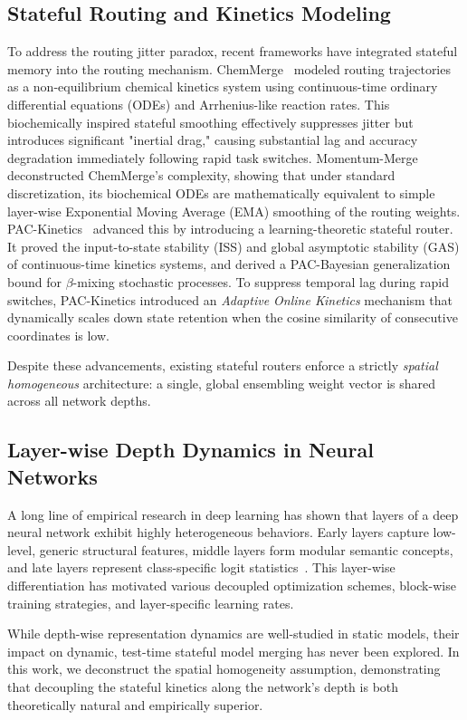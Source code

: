 \subsection{Stateful Routing and Kinetics Modeling}
To address the routing jitter paradox, recent frameworks have integrated stateful memory into the routing mechanism. ChemMerge~\cite{chemmerge_2026} modeled routing trajectories as a non-equilibrium chemical kinetics system using continuous-time ordinary differential equations (ODEs) and Arrhenius-like reaction rates. This biochemically inspired stateful smoothing effectively suppresses jitter but introduces significant "inertial drag," causing substantial lag and accuracy degradation immediately following rapid task switches. 
Momentum-Merge~\cite{momentum_merge_2026} deconstructed ChemMerge's complexity, showing that under standard discretization, its biochemical ODEs are mathematically equivalent to simple layer-wise Exponential Moving Average (EMA) smoothing of the routing weights. 
PAC-Kinetics~\cite{pac_kinetics_2026} advanced this by introducing a learning-theoretic stateful router. It proved the input-to-state stability (ISS) and global asymptotic stability (GAS) of continuous-time kinetics systems, and derived a PAC-Bayesian generalization bound for $\beta$-mixing stochastic processes. To suppress temporal lag during rapid switches, PAC-Kinetics introduced an \emph{Adaptive Online Kinetics} mechanism that dynamically scales down state retention when the cosine similarity of consecutive coordinates is low. 

Despite these advancements, existing stateful routers enforce a strictly \emph{spatial homogeneous} architecture: a single, global ensembling weight vector is shared across all network depths.

\subsection{Layer-wise Depth Dynamics in Neural Networks}
A long line of empirical research in deep learning has shown that layers of a deep neural network exhibit highly heterogeneous behaviors. Early layers capture low-level, generic structural features, middle layers form modular semantic concepts, and late layers represent class-specific logit statistics~\cite{DudaHart2nd, MachineLearningI}. This layer-wise differentiation has motivated various decoupled optimization schemes, block-wise training strategies, and layer-specific learning rates. 

While depth-wise representation dynamics are well-studied in static models, their impact on dynamic, test-time stateful model merging has never been explored. In this work, we deconstruct the spatial homogeneity assumption, demonstrating that decoupling the stateful kinetics along the network's depth is both theoretically natural and empirically superior.
